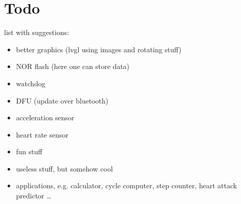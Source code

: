 \documentclass[letterpaper,10pt,english]{sphinxmanual}
\begin{document}
\section{Todo}
\label{\detokenize{about:todo}}
list with suggestions:
\begin{itemize}
\item {} 
better graphics (lvgl using images and rotating stuff)

\item {} 
NOR flash (here one can store data)

\item {} 
watchdog

\item {} 
DFU (update over bluetooth)

\item {} 
acceleration sensor

\item {} 
heart rate sensor

\item {} 
fun stuff

\item {} 
useless stuff, but somehow cool

\item {} 
applications, e.g. calculator, cycle computer, step counter, heart attack predictor …

\end{itemize}



\renewcommand{\indexname}{Index}
\printindex
\end{document}
